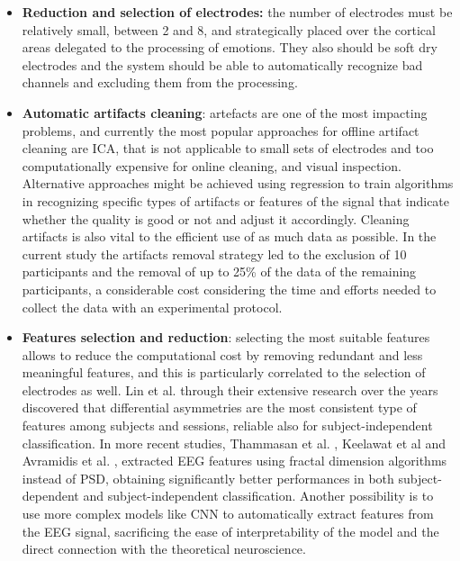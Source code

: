 \begin{itemize}
\item 	\textbf{Reduction and selection of electrodes:} the number of electrodes must be relatively small, between 2 and 8, and strategically placed over the cortical areas delegated to the processing of emotions. They also should be soft dry electrodes and the system should be able to automatically recognize bad channels and excluding them from the processing.
\item 	\textbf{Automatic artifacts cleaning}: artefacts are one of the most impacting problems, and currently the most popular approaches for offline artifact cleaning are \ac{ICA}, that is not applicable to small sets of electrodes and too computationally expensive for online cleaning, and visual inspection. Alternative approaches might be achieved using regression to train algorithms in recognizing specific types of artifacts or features of the signal that indicate whether the quality is good or not and adjust it accordingly. Cleaning artifacts is also vital to the efficient use of as much data as possible. In the current study the artifacts removal strategy led to the exclusion of 10 participants and the removal of up to 25\% of the data of the remaining participants, a considerable cost considering the time and efforts needed to collect the data with an experimental protocol.
\item 	\textbf{Features selection and reduction}: selecting the most suitable features allows to reduce the computational cost by removing redundant and less meaningful features, and this is particularly correlated to the selection of electrodes as well. Lin et al. \cite{lin_toward_2015} through their extensive research over the years discovered that differential asymmetries are the most consistent type of features among subjects and sessions, reliable also for subject-independent classification. In more recent studies, Thammasan et al. \cite{thammasan_continuous_2016}, Keelawat et al \cite{keelawat_comparative_2021} and Avramidis et al. \cite{avramidis_multiscale_2021} , extracted \ac{EEG} features using fractal dimension algorithms instead of \ac{PSD}, obtaining significantly better performances in both subject-dependent and subject-independent classification. Another possibility is to use more complex models like \ac{CNN} \cite{keelawat_comparative_2021} to automatically extract features from the \ac{EEG} signal, sacrificing the ease of interpretability of the model and the direct connection with the theoretical neuroscience.

\end{itemize}
